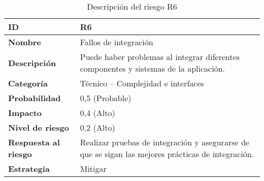 \begin{table}[H]
	\centering
	\begin{tabular}{|l|m{12cm}|}
		\hline
		\textbf{ID}                  & R6                                                                                                 \\
		\hline
		\textbf{Nombre}              & Fallos de integración                                                                              \\
		\hline
		\textbf{Descripción}         & Puede haber problemas al integrar diferentes componentes y sistemas de la aplicación.              \\
		\hline
		\textbf{Categoría}           & Técnico – Complejidad e interfaces                                                                 \\
		\hline
		\textbf{Probabilidad}        & 0,5 (Probable)                                                                                     \\
		\hline
		\textbf{Impacto}             & 0,4 (Alto)                                                                                         \\
		\hline
		\textbf{Nivel de riesgo}     & 0,2 (Alto)                                                                                         \\
		\hline
		\textbf{Respuesta al riesgo} & Realizar pruebas de integración y asegurarse de que se sigan las mejores prácticas de integración. \\
		\hline
		\textbf{Estrategia}          & Mitigar                                                                                            \\
		\hline
	\end{tabular}
	\caption{Descripción del riesgo R6}
\end{table}

\vspace{0.5cm}

